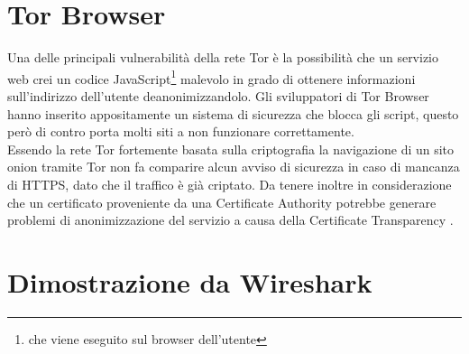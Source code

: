 \section{Tor Browser}
Una delle principali vulnerabilità della rete Tor è la possibilità che un servizio web crei un codice JavaScript\footnote{che viene eseguito sul browser dell'utente} malevolo in grado di ottenere informazioni sull'indirizzo dell'utente deanonimizzandolo. 
Gli sviluppatori di Tor Browser hanno inserito appositamente un sistema di sicurezza che blocca gli script, questo però di contro porta molti siti a non funzionare correttamente. \\
Essendo la rete Tor fortemente basata sulla criptografia la navigazione di un sito onion tramite Tor non fa comparire alcun avviso di sicurezza in caso di mancanza di HTTPS, dato che il traffico è già criptato. 
Da tenere inoltre in considerazione che un certificato proveniente da una Certificate Authority potrebbe generare problemi di anonimizzazione del servizio a causa della Certificate Transparency \cite{CertificateTransparency}. \\
\newpage
\section{Dimostrazione da Wireshark}

